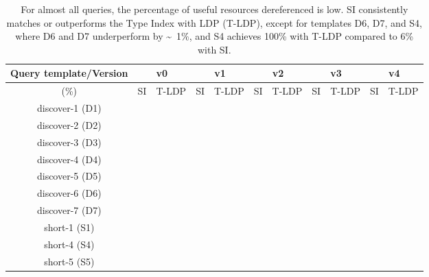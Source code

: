 \begin{table}[htbp]
	\begin{center}
		\begin{tabular}{|c|c|c|c|c|c|c|c|c|c|c|}
			\hline
            \multicolumn{1}{|c}{Query template/Version} & \multicolumn{2}{|c|}{v0} & \multicolumn{2}{|c|}{v1} & \multicolumn{2}{|c|}{v2} & \multicolumn{2}{|c|}{v3} & \multicolumn{2}{|c|}{v4} \\
			\hline
            (\%) & SI  & T-LDP & SI & T-LDP & SI & T-LDP& SI & T-LDP & SI & T-LDP \\
            \hline
			discover-1 (D1) & {} & {} & {} & {} & {} & {} & {} & {} & {} & {} \\
            \hline
            discover-2 (D2) & {} & {} & {} & {} & {} & {} & {} & {} & {} & {} \\
			\hline
            discover-3 (D3) & {} & {} & {} & {} & {} & {} & {} & {} & {} & {} \\
			\hline
            discover-4 (D4) & {} & {} & {} & {} & {} & {} & {} & {} & {} & {} \\
			\hline
            discover-5 (D5) & {} & {} & {} & {} & {} & {} & {} & {} & {} & {} \\
			\hline
            discover-6 (D6) & {} & {} & {} & {} & {} & {} & {} & {} & {} & {} \\
			\hline
            discover-7 (D7) & {} & {} & {} & {} & {} & {} & {} & {} & {} & {} \\
			\hline
            short-1 (S1) & {} & {} & {} & {} & {} & {} & {} & {} & {} & {} \\
			\hline
            short-4 (S4) & {} & {} & {} & {} & {} & {} & {} & {} & {} & {} \\
			\hline
            short-5 (S5) & {} & {} & {} & {} & {} & {} & {} & {} & {} & {} \\
			\hline
		\end{tabular}
	\end{center}
	\caption{
        For almost all queries, the percentage of useful resources dereferenced is low. 
		SI consistently matches or outperforms the Type Index with LDP (T-LDP), except for templates D6, D7, and S4, where D6 and D7 underperform by \textasciitilde~1\%, and S4 achieves 100\% with T-LDP compared to 6\% with SI.
		}
	\label{tab:ratioUsefulResources}
\end{table}